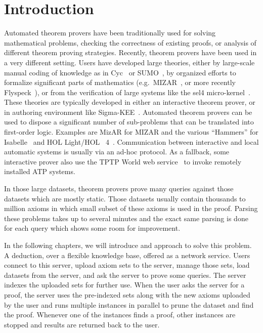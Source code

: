 \chapter{Introduction}
\label{chap:intro}

Automated theorem provers have been traditionally used for solving mathematical problems, checking the correctness of existing proofs, or analysis of different theorem proving strategies. Recently, theorem provers have been used in a very different setting. Users have developed large theories, either by large-scale manual coding of knowledge as in Cyc~\cite{RRG:CO-2005} or SUMO~\cite{PNL:AAAIWS-2002}, by organized efforts to formalize significant parts of mathematics (e.g.~MIZAR~\cite{TB:IJCAI-1985}, or more recently Flyspeck~\cite{HHMNOZ:Kepler-2011}), or from the verification of large systems like the sel4 micro-kernel~\cite{KE:SOSP-2009}. These theories are typically developed in either an interactive theorem prover, or in authoring environment like Sigma-KEE~\cite{PS:IJCAR-2014}. Automated theorem provers can be used to dispose a significant number of sub-problems that can be translated into first-order logic. Examples are MizAR for MIZAR and the various ``Hammers'' for Isabelle~\cite{MP:JAL-2007,MP:JAR-2009,BN:IJCAR-2010} and HOL Light/HOL~ 4~\cite{KU:JAR-2014,GK:CPP-2015}. Communication between interactive and local automatic systems is usually via an ad-hoc protocol. As a fallback, some interactive prover also use the TPTP World web service~\cite{Sutcliffe:LPAR-2010} to invoke remotely installed ATP systems.

In those large datasets, theorem provers prove many queries against those datasets which are mostly static. Those datasets usually contain thousands to million axioms in which small subset of these axioms is used in the proof. Parsing these problems takes up to several minutes and the exact same parsing is done for each query which shows some room for improvement.

In the following chapters, we will introduce and approach to solve this problem. A deduction, over a flexible knowledge base, offered as a network service. Users connect to this server, upload axiom sets to the server, manage those sets, load datasets from the server, and ask the server to prove some queries. The server indexes the uploaded sets for further use. When the user asks the server for a proof, the server uses the pre-indexed sets along with the new axioms uploaded by the user and runs multiple instances in parallel to prune the dataset and find the proof. Whenever one of the instances finds a proof, other instances are stopped and results are returned back to the user.

